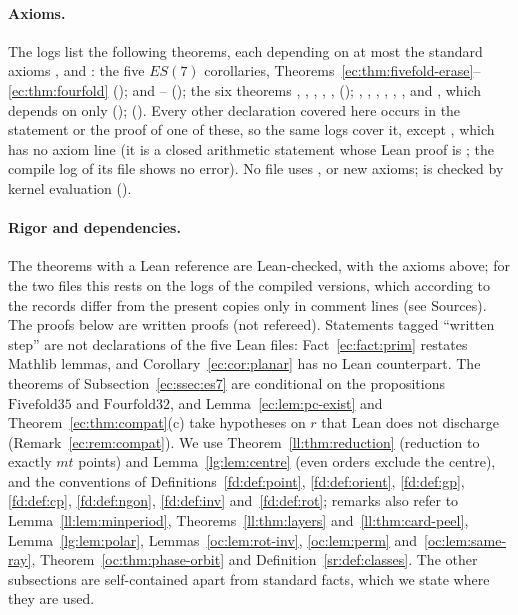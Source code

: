 \paragraph{Axioms.} The logs list the following theorems, each depending on at most the standard axioms
,  and : the five $ES(7)$ corollaries,
Theorems~\ref{ec:thm:fivefold-erase}--\ref{ec:thm:fourfold} (); 
and -- (); the six theorems ,
, , , ,
 (); , ,
, , , , and , which
depends on  only (); 
(). Every other declaration covered here occurs in the statement or the proof
of one of these, so the same logs cover it, except , which has no axiom line (it is a closed
arithmetic statement whose Lean proof is ; the compile log of its file shows no error). No file uses ,
 or new axioms;  is checked by kernel evaluation ().

\paragraph{Rigor and dependencies.} The theorems with a Lean reference are Lean-checked, with the axioms above; for the
two  files this rests on the logs of the compiled versions, which according to the records differ from the
present copies only in comment lines (see Sources). The proofs below are written proofs (not refereed). Statements
tagged ``written step'' are not declarations of the five Lean files: Fact~\ref{ec:fact:prim} restates Mathlib lemmas,
and Corollary~\ref{ec:cor:planar} has no Lean counterpart. The theorems of Subsection~\ref{ec:ssec:es7} are
conditional on the propositions $\mathrm{Fivefold35}$ and $\mathrm{Fourfold32}$, and Lemma~\ref{ec:lem:pc-exist} and
Theorem~\ref{ec:thm:compat}(c) take hypotheses on $r$ that Lean does not discharge (Remark~\ref{ec:rem:compat}). We
use Theorem~\ref{ll:thm:reduction} (reduction to exactly $mt$ points) and Lemma~\ref{lg:lem:centre} (even orders
exclude the centre), and the conventions of Definitions~\ref{fd:def:point}, \ref{fd:def:orient}, \ref{fd:def:gp},
\ref{fd:def:cp}, \ref{fd:def:ngon}, \ref{fd:def:inv} and~\ref{fd:def:rot}; remarks also refer to
Lemma~\ref{ll:lem:minperiod}, Theorems~\ref{ll:thm:layers} and~\ref{ll:thm:card-peel}, Lemma~\ref{lg:lem:polar},
Lemmas~\ref{oc:lem:rot-inv}, \ref{oc:lem:perm} and~\ref{oc:lem:same-ray}, Theorem~\ref{oc:thm:phase-orbit} and
Definition~\ref{sr:def:classes}. The other subsections are self-contained apart from standard facts, which we state
where they are used.

